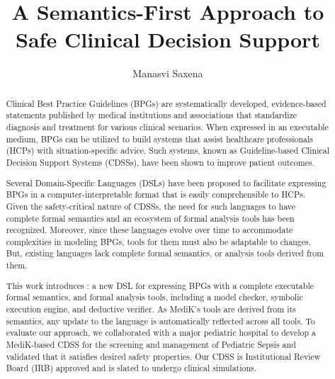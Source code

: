 \documentclass{uiucthesis2021}
\begin{document}
\title{A Semantics-First Approach to Safe Clinical Decision Support}
\author{Manasvi Saxena}
\phdthesis
{}
\maketitle

\frontmatter

\begin{abstract}
Clinical Best Practice Guidelines (BPGs) are systematically developed,
evidence-based statements published by medical institutions and associations
that standardize diagnosis and treatment for various clinical scenarios. When
expressed in an executable medium, BPGs can be utilized to build systems that
assist healthcare professionals (HCPs) with situation-specific advice. Such
systems, known as Guideline-based Clinical Decision Support Systems (CDSSs),
  have been shown to improve patient outcomes.

Several Domain-Specific Languages (DSLs) have been proposed to facilitate expressing BPGs in a computer-interpretable format that is easily comprehensible to HCPs.
Given the safety-critical nature of CDSSs, the need for such languages to have complete formal semantics and an ecosystem of formal analysis tools has been recognized.
Moreover, since these languages evolve over time to accommodate complexities in modeling BPGs, tools for them must also be adaptable to changes.
But, existing languages lack complete formal semantics, or analysis tools derived from them.

This work introduces \MediK{}: a new DSL for expressing BPGs with a complete executable formal semantics,
and formal analysis tools, including a model checker, symbolic execution engine, and deductive verifier.
As MediK's tools are derived from its semantics, any update to the language is automatically reflected across all tools. To evaluate our approach, we collaborated with a major pediatric hospital to develop a MediK-based CDSS for the screening and management of Pediatric Sepsis and validated that it satisfies desired safety properties.
Our CDSS is Institutional Review Board (IRB) approved and is slated to undergo clinical simulations.
\end{abstract}
%
%
\end{document}
